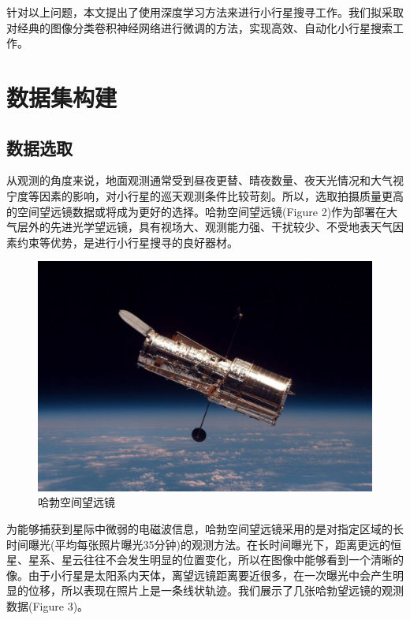\documentclass[12pt,a4paper]{article}%
\begin{document}
针对以上问题，本文提出了使用深度学习方法来进行小行星搜寻工作。我们拟采取对经典的图像分类卷积神经网络进行微调的方法，实现高效、自动化小行星搜索工作。

\section{数据集构建}

\subsection{数据选取}

从观测的角度来说，地面观测通常受到昼夜更替、晴夜数量、夜天光情况和大气视宁度等因素的影响，对小行星的巡天观测条件比较苛刻。所以，选取拍摄质量更高的空间望远镜数据或将成为更好的选择。哈勃空间望远镜(Figure 2)作为部署在大气层外的先进光学望远镜，具有视场大、观测能力强、干扰较少、不受地表天气因素约束等优势，是进行小行星搜寻的良好器材。

\begin{figure}[H]%
    \centering
    \begin{minipage}{0.7\textwidth}%
        \centering
        \includegraphics[width=1.0%
            \textwidth]{hubble}%
        \caption{\fontsize{10pt}{15pt}\selectfont 哈勃空间望远镜}%
    \end{minipage}
\end{figure}

为能够捕获到星际中微弱的电磁波信息，哈勃空间望远镜采用的是对指定区域的长时间曝光(平均每张照片曝光35分钟)的观测方法。在长时间曝光下，距离更远的恒星、星系、星云往往不会发生明显的位置变化，所以在图像中能够看到一个清晰的像。由于小行星是太阳系内天体，离望远镜距离要近很多，在一次曝光中会产生明显的位移，所以表现在照片上是一条线状轨迹。我们展示了几张哈勃望远镜的观测数据(Figure 3)。
\end{document}
